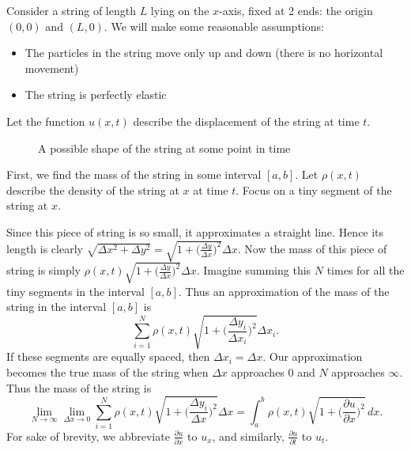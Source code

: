\documentclass{amsart}
\begin{document}
  Consider a string of length $L$ lying on the $x$-axis, fixed at 2 ends: the origin $(0, 0)$ and $(L, 0)$. We will make some reasonable assumptions:
  \begin{itemize}
    \item The particles in the string move only up and down (there is no horizontal movement)
    \item The string is perfectly elastic
  \end{itemize}Let the function $u(x, t)$ describe the displacement of the string at time $t$.
  \begin{figure}[H]
    \centering
    \caption{A possible shape of the string at some point in time}
  \end{figure}
  First, we find the mass of the string in some interval $[a, b]$. Let  $\rho(x, t)$ describe the density of the string at  $x$ at time $t$. Focus on a tiny segment of the string at $x$.
  \begin{figure}[H]
  \end{figure}
  Since this piece of string is so small, it approximates a straight line. Hence its length is clearly $\sqrt{\Delta x^2 + \Delta y^2} = \sqrt{1 + \big(\frac{\Delta y}{\Delta x}\big)^2}\Delta x$. Now the mass of this piece of string is simply $\rho(x, t)\sqrt{1 + \big(\frac{\Delta y}{\Delta x}\big)^2}\Delta x$. Imagine summing this $N$ times for all the tiny segments in the interval $[a, b]$. Thus an approximation of the mass of the string  in the interval $[a, b]$ is \[
    \sum_{i=1}^{N} \rho(x, t)\sqrt{1 + \Big(\frac{\Delta y_i}{\Delta x_i}\Big)^2}\Delta x_i
  .\] If these segments are equally spaced, then $\Delta x_i = \Delta x$. Our approximation becomes the true mass of the string when  $\Delta x$ approaches 0 and $N$ approaches $\infty$. Thus the mass of the string is \[
  \lim_{N \to \infty} \lim_{\Delta x \to 0} \sum_{i=1}^{N} \rho(x, t)\sqrt{1 + \Big(\frac{\Delta y_i}{\Delta x}\Big)^2}\Delta x = \int_{a}^{b} \rho(x, t)\sqrt{1 + \Big(\frac{\partial u}{\partial x}\Big)^2}\, dx
.\] For sake of brevity, we abbreviate $\frac{\partial u}{\partial x}$ to  $u_x$, and similarly, $\frac{\partial u}{\partial t}$ to $u_t$.
\end{document}
